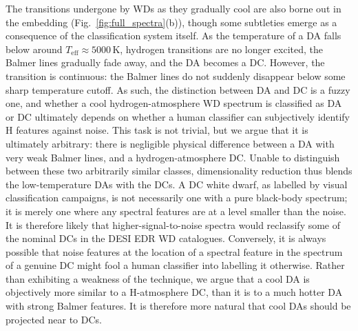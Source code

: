 \documentclass[fleqn,usenatbib]{mnras}
\def\Teff{T_\mathrm{eff}}
\begin{document}
The transitions undergone by WDs as they gradually cool are also borne out in the embedding (Fig.~\ref{fig:full_spectra}(b)), though some subtleties emerge as a consequence of the classification system itself.
As the temperature of a DA falls below around $\Teff\approx 5000\,\text{K}$, hydrogen transitions are no longer excited, the Balmer lines gradually fade away, and the DA becomes a DC.
However, the transition is continuous: the Balmer lines do not suddenly disappear below some sharp temperature cutoff.
As such, the distinction between DA and DC is a fuzzy one, and whether a cool hydrogen-atmosphere WD spectrum is classified as DA or DC ultimately depends on whether a human classifier can subjectively identify H features against noise.
This task is not trivial, but we argue that it is ultimately arbitrary: there is negligible physical difference between a DA with very weak Balmer lines, and a hydrogen-atmosphere DC.
Unable to distinguish between these two arbitrarily similar classes, dimensionality reduction thus blends the low-temperature DAs with the DCs.
A DC white dwarf, as labelled by visual classification campaigns, is not necessarily one with a pure black-body spectrum; it is merely one where any spectral features are at a level smaller than the noise.
It is therefore likely that higher-signal-to-noise spectra would reclassify some of the nominal DCs in the DESI EDR WD catalogues.
Conversely, it is always possible that noise features at the location of a spectral feature in the spectrum of a genuine DC might fool a human classifier into labelling it otherwise.
Rather than exhibiting a weakness of the technique, we argue that a cool DA is objectively more similar to a H-atmosphere DC, than it is to a much hotter DA with strong Balmer features.
It is therefore more natural that cool DAs should be projected near to DCs.
\end{document}

